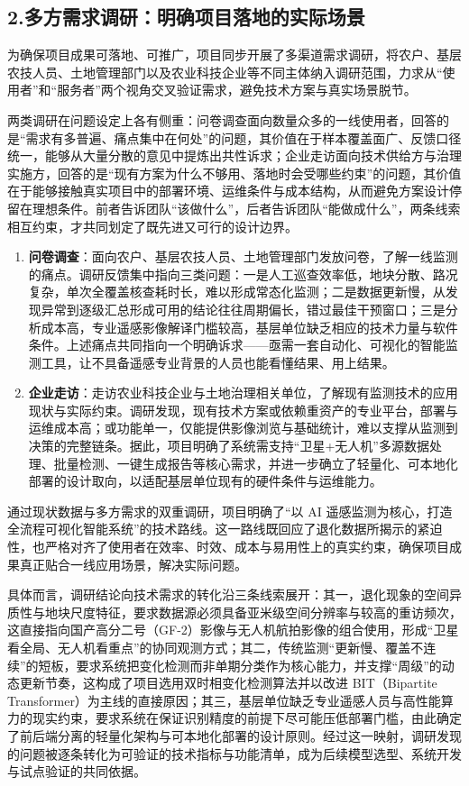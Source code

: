 \documentclass[12pt, a4paper]{ctexart}
\begin{document}
\subsection{2.多方需求调研：明确项目落地的实际场景}

为确保项目成果可落地、可推广，项目同步开展了多渠道需求调研，将农户、基层农技人员、土地管理部门以及农业科技企业等不同主体纳入调研范围，力求从“使用者”和“服务者”两个视角交叉验证需求，避免技术方案与真实场景脱节。

两类调研在问题设定上各有侧重：问卷调查面向数量众多的一线使用者，回答的是“需求有多普遍、痛点集中在何处”的问题，其价值在于样本覆盖面广、反馈口径统一，能够从大量分散的意见中提炼出共性诉求；企业走访面向技术供给方与治理实施方，回答的是“现有方案为什么不够用、落地时会受哪些约束”的问题，其价值在于能够接触真实项目中的部署环境、运维条件与成本结构，从而避免方案设计停留在理想条件。前者告诉团队“该做什么”，后者告诉团队“能做成什么”，两条线索相互约束，才共同划定了既先进又可行的设计边界。

\begin{enumerate}
    \item \textbf{问卷调查}：面向农户、基层农技人员、土地管理部门发放问卷，了解一线监测的痛点。调研反馈集中指向三类问题：一是人工巡查效率低，地块分散、路况复杂，单次全覆盖核查耗时长，难以形成常态化监测；二是数据更新慢，从发现异常到逐级汇总形成可用的结论往往周期偏长，错过最佳干预窗口；三是分析成本高，专业遥感影像解译门槛较高，基层单位缺乏相应的技术力量与软件条件。上述痛点共同指向一个明确诉求——亟需一套自动化、可视化的智能监测工具，让不具备遥感专业背景的人员也能看懂结果、用上结果。
    \item \textbf{企业走访}：走访农业科技企业与土地治理相关单位，了解现有监测技术的应用现状与实际约束。调研发现，现有技术方案或依赖重资产的专业平台，部署与运维成本高；或功能单一，仅能提供影像浏览与基础统计，难以支撑从监测到决策的完整链条。据此，项目明确了系统需支持“卫星+无人机”多源数据处理、批量检测、一键生成报告等核心需求，并进一步确立了轻量化、可本地化部署的设计取向，以适配基层单位现有的硬件条件与运维能力。
\end{enumerate}

通过现状数据与多方需求的双重调研，项目明确了“以 AI 遥感监测为核心，打造全流程可视化智能系统”的技术路线。这一路线既回应了退化数据所揭示的紧迫性，也严格对齐了使用者在效率、时效、成本与易用性上的真实约束，确保项目成果真正贴合一线应用场景，解决实际问题。

具体而言，调研结论向技术需求的转化沿三条线索展开：其一，退化现象的空间异质性与地块尺度特征，要求数据源必须具备亚米级空间分辨率与较高的重访频次，这直接指向国产高分二号（GF-2）影像与无人机航拍影像的组合使用，形成“卫星看全局、无人机看重点”的协同观测方式；其二，传统监测“更新慢、覆盖不连续”的短板，要求系统把变化检测而非单期分类作为核心能力，并支撑“周级”的动态更新节奏，这构成了项目选用双时相变化检测算法并以改进 BIT（Bipartite Transformer）为主线的直接原因；其三，基层单位缺乏专业遥感人员与高性能算力的现实约束，要求系统在保证识别精度的前提下尽可能压低部署门槛，由此确定了前后端分离的轻量化架构与可本地化部署的设计原则。经过这一映射，调研发现的问题被逐条转化为可验证的技术指标与功能清单，成为后续模型选型、系统开发与试点验证的共同依据。
\end{document}
